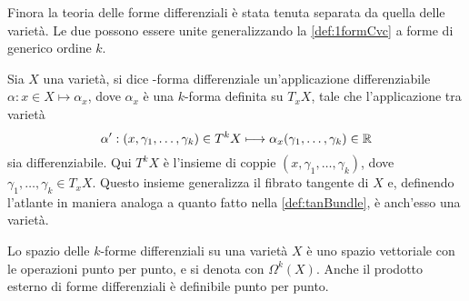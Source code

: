 Finora la teoria delle forme differenziali è stata tenuta separata da quella delle varietà. Le due possono essere unite generalizzando la \autoref{def:1formCvc} a forme di generico ordine $k$. 
\begin{definition}
  Sia $X$ una varietà, si dice -forma differenziale un'applicazione differenziabile $\alpha: x \in X \mapsto \alpha_x$, dove $\alpha_x$ è una $k$-forma definita su $T_x X$, tale che l'applicazione tra varietà \begin{equation}
    \alpha': (x, \gamma_1, \ldots, \gamma_k) \in T^k X \longmapsto \alpha_x(\gamma_1, \ldots, \gamma_k) \in \mathbb{R}
  \end{equation} 
  sia differenziabile. Qui $T^k X$ è l'insieme di coppie $(x, \gamma_1, \ldots, \gamma_k)$, dove $\gamma_1, \ldots,\gamma_k \in  T_x X$. Questo insieme generalizza il fibrato tangente di $X$ e, definendo l'atlante in maniera analoga a quanto fatto nella \autoref{def:tanBundle}, è anch'esso una varietà. 
\end{definition}
\begin{remark}
  Lo spazio delle $k$-forme differenziali su una varietà $X$ è uno spazio vettoriale con le operazioni punto per punto, e si denota con $\Omega^k (X)$. Anche il prodotto esterno di forme differenziali è definibile punto per punto.
\end{remark}

